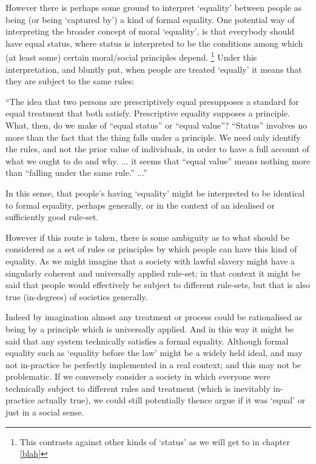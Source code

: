 However there is perhaps some ground to interpret `equality' between people as being (or being `captured by') a kind of formal equality.
One potential way of interpreting the broader concept of moral `equality', is that everybody should have equal status, where status is interpreted to be the conditions among which (at least some) certain moral/social principles depend.
\footnote{This contrasts against other kinds of `status' as we will get to in chapter \ref{blah}}
Under this interpretation, and bluntly put, when people are treated `equally' it means that they are subject to the same rules:
\begin{displayquote}
``The idea that two persons are prescriptively equal presupposes a standard for equal treatment that both satisfy. Prescriptive equality supposes a principle. What, then, do we make of ``equal status'' or ``equal value''? ``Status'' involves no more than the fact that the thing falls under a principle. We need only identify the rules, and not the prior value of individuals, in order to have a full account of what we ought to do and why.
...
it seems that ``equal value'' means nothing more than ``falling under the same rule.'' ...''\cite{whatisbasicequalitynathan}
\end{displayquote}
In this sense, that people's having `equality' might be interpreted to be identical to formal equality, perhaps generally, or in the context of an idealised or sufficiently good rule-set.

However if this route is taken, there is some ambiguity as to what should be considered as a set of rules or principles by which people can have this kind of equality.
As we might imagine that a society with lawful slavery might have a singularly coherent and universally applied rule-set; in that context it might be said that people would effectively be subject to different rule-sets, but that is also true (in-degrees) of societies generally.

Indeed by imagination almost any treatment or process could be rationalised as being by a principle which is universally applied. And in this way it might be said that any system technically satisfies a formal equality.
Although formal equality such as  `equality before the law' might be a widely held ideal, and may not in-practice be perfectly implemented in a real context; and this may not be problematic. If we conversely consider a society in which everyone were technically subject to different rules and treatment (which is inevitably in-practice actually true), we could still potentially thence argue if it was `equal' or just in a social sense.%

